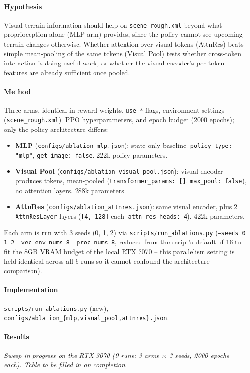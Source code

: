 \documentclass{article}
\begin{document}
\paragraph{Hypothesis}
Visual terrain information should help on \texttt{scene\_rough.xml} beyond
what proprioception alone (MLP arm) provides, since the policy cannot see
upcoming terrain changes otherwise. Whether attention over visual tokens
(AttnRes) beats simple mean-pooling of the same tokens (Visual Pool) tests
whether cross-token interaction is doing useful work, or whether the visual
encoder's per-token features are already sufficient once pooled.

\paragraph{Method}
Three arms, identical in reward weights, \texttt{use\_*} flags, environment
settings (\texttt{scene\_rough.xml}), PPO hyperparameters, and epoch budget
(2000 epochs); only the policy architecture differs:
\begin{itemize}
    \item \textbf{MLP} (\texttt{configs/ablation\_mlp.json}): state-only baseline, \texttt{policy\_type: "mlp"}, \texttt{get\_image: false}. 222k policy parameters.
    \item \textbf{Visual Pool} (\texttt{configs/ablation\_visual\_pool.json}): visual encoder produces tokens, mean-pooled (\texttt{transformer\_params: []}, \texttt{max\_pool: false}), no attention layers. 288k parameters.
    \item \textbf{AttnRes} (\texttt{configs/ablation\_attnres.json}): same visual encoder, plus 2 \texttt{AttnResLayer} layers (\texttt{[4, 128]} each, \texttt{attn\_res\_heads: 4}). 422k parameters.
\end{itemize}
Each arm is run with 3 seeds (0, 1, 2) via \texttt{scripts/run\_ablations.py}
(\texttt{--seeds 0 1 2 --vec-env-nums 8 --proc-nums 8}, reduced from the
script's default of 16 to fit the 8GB VRAM budget of the local RTX 3070 --
this parallelism setting is held identical across all 9 runs so it cannot
confound the architecture comparison).

\paragraph{Implementation}
\texttt{scripts/run\_ablations.py} (new), \texttt{configs/ablation\_\{mlp,visual\_pool,attnres\}.json}.

\paragraph{Results}
\textit{Sweep in progress on the RTX 3070 (9 runs: 3 arms $\times$ 3 seeds,
2000 epochs each). Table to be filled in on completion.}
\end{document}
